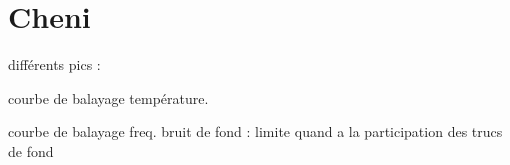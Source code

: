 \documentclass[a4paper,12pt,oneside]{article}
\begin{document}
\title{}
\author{Laurent Rohrbasser \& Tim Tuuva}

\maketitle
\tableofcontents
\baselineskip=16pt
\parindent=15pt
\parskip=5pt



\section{Cheni}


différents pics :

courbe de balayage température.


courbe de balayage freq.
bruit de fond :
limite quand a la participation des trucs de fond
















\end{document}
